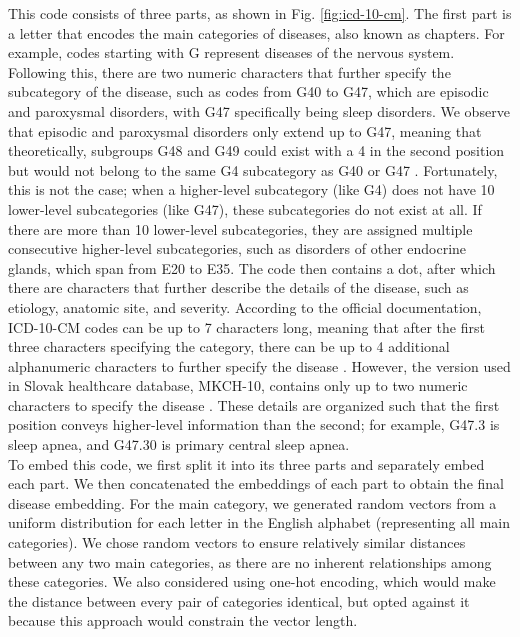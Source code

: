 This code consists of three parts, as shown in Fig. \ref{fig:icd-10-cm}. The first part is a letter that encodes the main categories of diseases, also known as chapters. For example, codes starting with G represent diseases of the nervous system. Following this, there are two numeric characters that further specify the subcategory of the disease, such as codes from G40 to G47, which are episodic and paroxysmal disorders, with G47 specifically being sleep disorders. We observe that episodic and paroxysmal disorders only extend up to G47, meaning that theoretically, subgroups G48 and G49 could exist with a 4 in the second position but would not belong to the same G4 subcategory as G40 or G47 \label{mkch_subdiv}. Fortunately, this is not the case; when a higher-level subcategory (like G4) does not have 10 lower-level subcategories (like G47), these subcategories do not exist at all. If there are more than 10 lower-level subcategories, they are assigned multiple consecutive higher-level subcategories, such as disorders of other endocrine glands, which span from E20 to E35. The code then contains a dot, after which there are characters that further describe the details of the disease, such as etiology, anatomic site, and severity. According to the official documentation, ICD-10-CM codes can be up to 7 characters long, meaning that after the first three characters specifying the category, there can be up to 4 additional alphanumeric characters to further specify the disease \cite{icd10expl}. However, the version used in Slovak healthcare database, MKCH-10, contains only up to two numeric characters to specify the disease \cite{mkch10expl}. These details are organized such that the first position conveys higher-level information than the second; for example, G47.3 is sleep apnea, and G47.30 is primary central sleep apnea.
\\

To embed this code, we first split it into its three parts and separately embed each part. We then concatenated the embeddings of each part to obtain the final disease embedding. For the main category, we generated random vectors from a uniform distribution for each letter in the English alphabet (representing all main categories). We chose random vectors to ensure relatively similar distances between any two main categories, as there are no inherent relationships among these categories. We also considered using one-hot encoding, which would make the distance between every pair of categories identical, but opted against it because this approach would constrain the vector length.
\\

